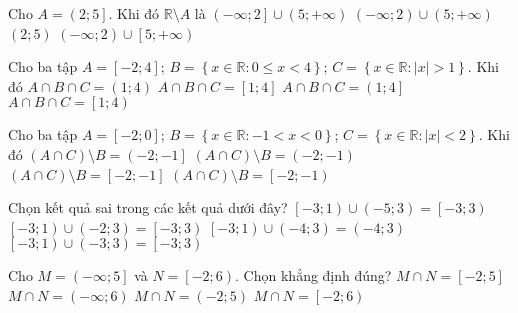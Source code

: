\begin{ex}%
	Cho $A=\left(2;5\right]$. Khi đó $\mathbb{R}\setminus A$ là
	\choice
	{\True $\left(-\infty ;2\right]\cup\left(5;+\infty\right)$}
	{$\left(-\infty ;2\right)\cup\left(5;+\infty\right)$}
	{$\left(2;5\right)$}
	{$\left(-\infty ;2\right)\cup\left[5;+\infty\right)$}
	\loigiai{
		Ta có $\mathbb{R}\setminus A=\left(-\infty ;2\right]\cup\left(5;+\infty\right)$.
	}
\end{ex}

\begin{ex}%
	Cho ba tập $A=\left[-2;4\right]$; $B=\left\{ x\in\mathbb{R}:0\leq x<4\right\}$; $C=\left\{ x\in\mathbb{R}:\left| x\right|>1\right\}$. Khi đó
	\choice
	{\True $A\cap B\cap C=\left(1;4\right)$}
	{$A\cap B\cap C=\left[1;4\right]$}
	{$A\cap B\cap C=\left(1;4\right]$}
	{$A\cap B\cap C=\left[1;4\right)$}
	\loigiai{
		Ta có $B=\left[0;4\right), C=\left(-\infty;-1\right)\cup \left(1;+\infty\right) \Rightarrow A\cap B\cap C=\left(1;4\right)$.
	}
\end{ex}

\begin{ex}%
	Cho ba tập $A=\left[-2;0\right]$; $B=\left\{ x\in\mathbb{R}:-1<x<0\right\}$; $C=\left\{ x\in\mathbb{R}:\left| x\right|<2\right\}$. Khi đó
	\choice
	{\True $\left(A\cap C\right)\setminus B=\left(-2;-1\right]$}
	{$\left(A\cap C\right)\setminus B=\left(-2;-1\right)$}
	{$\left(A\cap C\right)\setminus B=\left[-2;-1\right]$}
	{$\left(A\cap C\right)\setminus B=\left[-2;-1\right)$}
	\loigiai{
		Ta có $B=\left(-1;0\right), C=\left(-2;2\right) \Rightarrow \left(A\cap C\right)\setminus B=\left(-2;-1\right]$.	
	}
\end{ex}

\begin{ex}%
	Chọn kết quả sai trong các kết quả dưới đây?
	\choice
	{\True $\left[-3;1\right)\cup\left(-5;3\right)=\left[-3;3\right)$}
	{$\left[-3;1\right)\cup\left(-2;3\right)=\left[-3;3\right)$}
	{$\left[-3;1\right)\cup\left(-4;3\right)=\left(-4;3\right)$}
	{$\left[-3;1\right)\cup\left(-3;3\right)=\left[-3;3\right)$}
	\loigiai{
		Ta có	
		$\left[-3;1\right)\cup\left(-5;3\right)=\left(-5;3\right)$.
	}
\end{ex}

\begin{ex}%
	Cho $M=\left(-\infty ;5\right]$ và $N=\left[-2;6\right)$. Chọn khẳng định đúng?
	\choice
	{\True $M\cap N=\left[-2;5\right]$}
	{$M\cap N=\left(-\infty ;6\right)$}
	{$M\cap N=\left(-2;5\right)$}
	{$M\cap N=\left[-2;6\right)$}
\end{ex}


